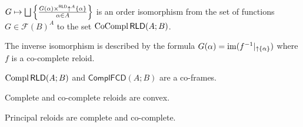 \begin{cor}
$G\mapsto\bigsqcup\left\{ \frac{G(\alpha)\times^{\mathsf{RLD}}\uparrow^{A}\{\alpha\}}{\alpha\in A}\right\}$
is an order isomorphism from the set of functions $G\in\mathscr{F}(B)^{A}$
to the set $\operatorname{CoCompl}\mathsf{RLD}(A;B)$.

The inverse isomorphism is described by the formula $G(\alpha)=\operatorname{im}(f^{-1}|_{\uparrow\{\alpha\}})$
where $f$ is a co-complete reloid.
\end{cor}

\begin{cor}
$\operatorname{Compl}\mathsf{RLD}(A;B)$ and $\mathsf{ComplFCD}(A;B)$ are a co-frames.\end{cor}
\begin{obvious}
Complete and co-complete reloids are convex.
\end{obvious}

\begin{obvious}
Principal reloids are complete and co-complete.
\end{obvious}


